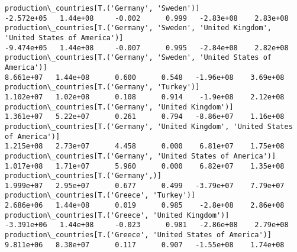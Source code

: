 \documentclass[11pt]{article}
\begin{document}
\begin{Verbatim}[commandchars=\\\{\}]
production\_countries[T.('Germany', 'Sweden')]                                                                                                                                         -2.572e+05   1.44e+08     -0.002      0.999   -2.83e+08    2.83e+08
production\_countries[T.('Germany', 'Sweden', 'United Kingdom', 'United States of America')]                                                                                           -9.474e+05   1.44e+08     -0.007      0.995   -2.84e+08    2.82e+08
production\_countries[T.('Germany', 'Sweden', 'United States of America')]                                                                                                              8.661e+07   1.44e+08      0.600      0.548   -1.96e+08    3.69e+08
production\_countries[T.('Germany', 'Turkey')]                                                                                                                                          1.102e+07   1.02e+08      0.108      0.914    -1.9e+08    2.12e+08
production\_countries[T.('Germany', 'United Kingdom')]                                                                                                                                  1.361e+07   5.22e+07      0.261      0.794   -8.86e+07    1.16e+08
production\_countries[T.('Germany', 'United Kingdom', 'United States of America')]                                                                                                      1.215e+08   2.73e+07      4.458      0.000    6.81e+07    1.75e+08
production\_countries[T.('Germany', 'United States of America')]                                                                                                                        1.017e+08   1.71e+07      5.960      0.000    6.82e+07    1.35e+08
production\_countries[T.('Germany',)]                                                                                                                                                   1.999e+07   2.95e+07      0.677      0.499   -3.79e+07    7.79e+07
production\_countries[T.('Greece', 'Turkey')]                                                                                                                                           2.686e+06   1.44e+08      0.019      0.985    -2.8e+08    2.86e+08
production\_countries[T.('Greece', 'United Kingdom')]                                                                                                                                  -3.391e+06   1.44e+08     -0.023      0.981   -2.86e+08    2.79e+08
production\_countries[T.('Greece', 'United States of America')]                                                                                                                         9.811e+06   8.38e+07      0.117      0.907   -1.55e+08    1.74e+08

\end{Verbatim}
\end{document}
